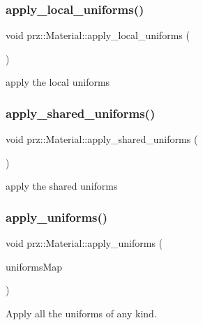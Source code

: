 \subsubsection{\texorpdfstring{apply\_local\_uniforms()}{apply\_local\_uniforms()}}
{\footnotesize\ttfamily void prz\+::\+Material\+::apply\+\_\+local\+\_\+uniforms (\begin{DoxyParamCaption}{ }\end{DoxyParamCaption})}



apply the local uniforms 

\mbox{\label{classprz_1_1_material_a97b7619874422fe0f154f85f5ac14a93}} 
\subsubsection{\texorpdfstring{apply\_shared\_uniforms()}{apply\_shared\_uniforms()}}
{\footnotesize\ttfamily void prz\+::\+Material\+::apply\+\_\+shared\+\_\+uniforms (\begin{DoxyParamCaption}{ }\end{DoxyParamCaption})}



apply the shared uniforms 

\mbox{\label{classprz_1_1_material_a537b0e3e75e1a8309f30326541344589}} 
\subsubsection{\texorpdfstring{apply\_uniforms()}{apply\_uniforms()}}
{\footnotesize\ttfamily void prz\+::\+Material\+::apply\+\_\+uniforms (\begin{DoxyParamCaption}\item[{P\+Map$<$ P\+String, \mbox{\hyperlink{structprz_1_1_uniform}{Uniform}} $>$ \&}]{uniforms\+Map }\end{DoxyParamCaption})\hspace{0.3cm}{\ttfamily [protected]}}



Apply all the uniforms of any kind. 


